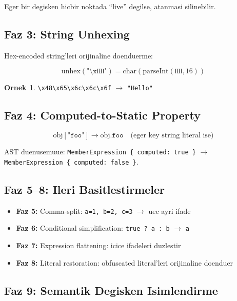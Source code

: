 \documentclass[12pt,a4paper,oneside]{book}
\theoremstyle{definition}
\newtheorem{example}{Ornek}[chapter]
\newcommand{\code}[1]{\texttt{\color{green!60!white}#1}}
\begin{document}
Eger bir degisken hicbir noktada ``live'' degilse, atanmasi silinebilir.

\subsection{Faz 3: String Unhexing}

Hex-encoded string'leri orijinaline doenduerme:

\begin{equation}
\text{unhex}(\texttt{"\textbackslash xHH"}) = \text{char}(\text{parseInt}(\texttt{HH}, 16))
\end{equation}

\begin{example}
\code{\textbackslash x48\textbackslash x65\textbackslash x6c\textbackslash x6c\textbackslash x6f} $\to$ \code{"Hello"}
\end{example}

\subsection{Faz 4: Computed-to-Static Property}

\begin{equation}
\text{obj}[\texttt{"foo"}] \to \text{obj}.\texttt{foo} \quad \text{(eger key string literal ise)}
\end{equation}

AST duenusemuue: \code{MemberExpression \{ computed: true \}} $\to$ \code{MemberExpression \{ computed: false \}}.

\subsection{Faz 5--8: Ileri Basitlestirmeler}

\begin{itemize}
\item \textbf{Faz 5:} Comma-split: \code{a=1, b=2, c=3} $\to$ uec ayri ifade
\item \textbf{Faz 6:} Conditional simplification: \code{true ? a : b} $\to$ \code{a}
\item \textbf{Faz 7:} Expression flattening: icice ifadeleri duzlestir
\item \textbf{Faz 8:} Literal restoration: obfuscated literal'leri orijinaline doenduer
\end{itemize}

\subsection{Faz 9: Semantik Degisken Isimlendirme}
\end{document}
